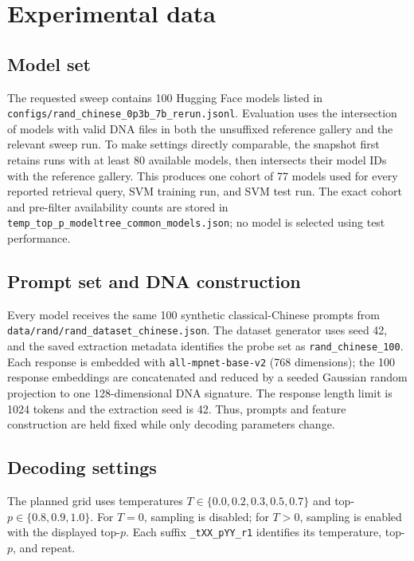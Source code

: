 \documentclass[11pt,a4paper]{article}
\begin{document}
\section{Experimental data}

\subsection{Model set}
The requested sweep contains 100 Hugging Face models listed in
\texttt{configs/rand\_chinese\_0p3b\_7b\_rerun.jsonl}.  Evaluation uses the
intersection of models with valid DNA files in both the unsuffixed reference
gallery and the relevant sweep run. To make settings directly comparable, the
snapshot first retains runs with at least 80 available models, then intersects
their model IDs with the reference gallery. This produces one cohort of 77
models used for every reported retrieval query, SVM training run, and SVM test
run. The exact cohort and pre-filter availability counts are stored in
\texttt{temp\_top\_p\_modeltree\_common\_models.json}; no model is selected
using test performance.

\subsection{Prompt set and DNA construction}
Every model receives the same 100 synthetic classical-Chinese prompts from
\texttt{data/rand/rand\_dataset\_chinese.json}.  The dataset generator uses seed
42, and the saved extraction metadata identifies the probe set as
\texttt{rand\_chinese\_100}.  Each response is embedded with
\texttt{all-mpnet-base-v2} (768 dimensions); the 100 response embeddings are
concatenated and reduced by a seeded Gaussian random projection to one
128-dimensional DNA signature.  The response length limit is 1024 tokens and
the extraction seed is 42.  Thus, prompts and feature construction are held
fixed while only decoding parameters change.

\subsection{Decoding settings}
The planned grid uses temperatures $T\in\{0.0,0.2,0.3,0.5,0.7\}$ and
top-$p\in\{0.8,0.9,1.0\}$.  For $T=0$, sampling is disabled; for $T>0$,
sampling is enabled with the displayed top-$p$.  Each suffix
\texttt{\_tXX\_pYY\_r1} identifies its temperature, top-$p$, and repeat.
\end{document}
